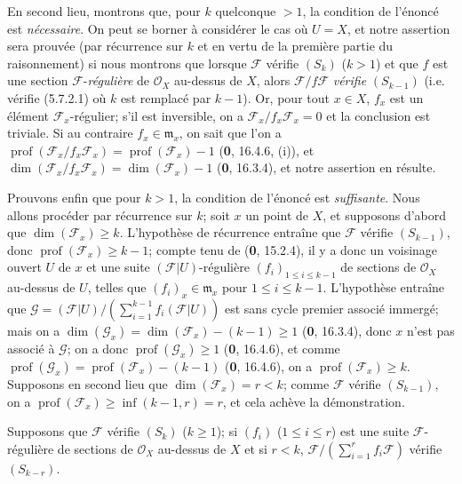 En second lieu, montrons que, pour $k$ quelconque $>1$, la condition de
l'énoncé est \emph{nécessaire}. On peut se borner à considérer le cas où $U=X$,
et notre assertion sera prouvée (par récurrence sur $k$ et en vertu de la
première partie du raisonnement) si nous montrons que lorsque $\mathscr F$
vérifie $(S_k)$ ($k>1$) et que $f$ est une section $\mathscr F$-\emph{régulière}
de $\mathcal O_X$ au-dessus de $X$, alors $\mathscr F/f\mathscr F$ \emph{vérifie}
$(S_{k-1})$ (i.e. vérifie (5.7.2.1) où $k$ est remplacé par $k-1$). Or,
pour tout $x\in X$, $f_x$ est un élément $\mathscr F_x$-régulier; s'il est
inversible, on a $\mathscr F_x/f_x\mathscr F_x=0$ et la conclusion est
triviale. Si au contraire $f_x\in\mathfrak m_x$, on sait que l'on a
$\operatorname{prof}(\mathscr F_x/f_x\mathscr F_x)
=\operatorname{prof}(\mathscr F_x)-1$ (\textbf{0}, 16.4.6, (i)), et
$\dim(\mathscr F_x/f_x\mathscr F_x)=\dim(\mathscr F_x)-1$ (\textbf{0}, 16.3.4), et
notre assertion en résulte.

Prouvons enfin que pour $k>1$, la condition de l'énoncé est \emph{suffisante}. Nous
allons procéder par récurrence sur $k$; soit $x$ un point de $X$, et
supposons d'abord que $\dim(\mathscr F_x)\geq k$. L'hypothèse de récurrence
entraîne que $\mathscr F$ vérifie $(S_{k-1})$, donc
$\operatorname{prof}(\mathscr F_x)\geq k-1$; compte tenu de (\textbf{0}, 15.2.4), il
y a donc un voisinage ouvert $U$ de $x$ et une suite
$(\mathscr F|U)$-régulière $(f_i)_{1\leq i\leq k-1}$ de sections de
$\mathcal O_X$ au-dessus de $U$, telles que $(f_i)_x\in\mathfrak m_x$ pour
$1\leq i\leq k-1$. L'hypothèse entraîne que
$\mathscr G=(\mathscr F|U)/(\sum_{i=1}^{k-1}
f_i(\mathscr F|U))$
est sans cycle premier associé immergé; mais on a
$\dim(\mathscr G_x)=\dim(\mathscr F_x)-(k-1)\geq1$ (\textbf{0}, 16.3.4), donc $x$
n'est pas associé à $\mathscr G$; on a donc
$\operatorname{prof}(\mathscr G_x)\geq1$ (\textbf{0}, 16.4.6), et comme
$\operatorname{prof}(\mathscr G_x)=\operatorname{prof}(\mathscr F_x)-(k-1)$
(\textbf{0}, 16.4.6), on a $\operatorname{prof}(\mathscr F_x)\geq k$. Supposons en
second lieu que $\dim(\mathscr F_x)=r<k$; comme $\mathscr F$ vérifie
$(S_{k-1})$, on a
$\operatorname{prof}(\mathscr F_x)\geq\inf(k-1,r)=r$, et cela achève la
démonstration.

\begin{corollary}[5.7.6]
\label{IV.2.s5.7.6-fr}
Supposons que $\mathscr F$ vérifie $(S_k)$ ($k\geq1$); si
$(f_i)$ ($1\leq i\leq r$) est une suite $\mathscr F$-régulière de sections
de $\mathcal O_X$ au-dessus de $X$ et si $r<k$,
$\mathscr F/(\sum_{i=1}^r f_i\mathscr F)$ vérifie $(S_{k-r})$.
\end{corollary}

